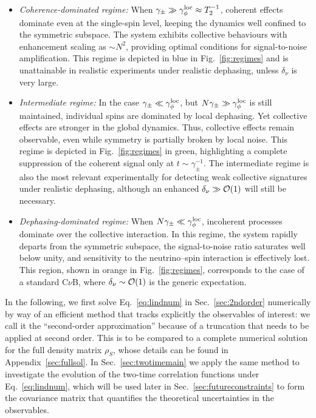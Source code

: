 \documentclass[aps,prd,10pt,twocolumn,superscriptaddress,floatfix,nofootinbib,amsmath,amssymb,altaffilletter,preprintnumbers]{revtex4-1}
\begin{document}
\begin{itemize}
    \item \emph{Coherence-dominated regime:} When $\gamma_{\pm} \gg \gamma^{\rm loc}_{\phi} \approx T_2^{-1}$, coherent effects dominate even at the single-spin level, keeping the dynamics well confined to the symmetric subspace. The system exhibits collective behaviours with enhancement scaling as $\sim N^2$, providing optimal conditions for signal-to-noise amplification. This regime is depicted in blue in Fig.~\ref{fig:regimes} and is unattainable in realistic experiments under realistic dephasing, unless $\delta_\nu$ is very large.

    \item \emph{Intermediate regime:} In the case $\gamma_{\pm} \ll \gamma^{\rm loc}_{\phi}$, but $N\gamma_{\pm} \gg \gamma^{\rm loc}_{\phi}$ is still maintained, individual spins are dominated by local dephasing. Yet collective effects are stronger in the global dynamics. Thus, collective effects remain observable, even while symmetry is partially broken by local noise.
    This regime is depicted in Fig.~\ref{fig:regimes} in green, highlighting a complete suppression of the coherent signal only at $t\sim\gamma^{-1}_{\pm}$.   The intermediate regime is also the most relevant experimentally for detecting weak collective signatures under realistic dephasing, although an enhanced $\delta_{\nu}\gg {\cal O}(1)$ will still be necessary. 
    
    \item \emph{Dephasing-dominated regime:} When $N\gamma_{\pm} \ll \gamma^{\rm loc}_{\phi}$, incoherent processes dominate over the collective interaction. In this regime, the system rapidly departs from the symmetric subspace, the signal-to-noise ratio saturates well below unity, and sensitivity to the neutrino–spin interaction is effectively lost. This region, shown in orange in Fig.~\ref{fig:regimes}, corresponds to the case of a standard C$\nu$B, where $\delta_\nu \sim {\cal O}(1)$ is the generic expectation. 
   
\end{itemize}




In the following, we first solve Eq.~\eqref{eq:lindnum} in Sec.~\ref{sec:2ndorder}
numerically by way of an efficient method that tracks explicitly the observables of interest: we call it the ``second-order approximation'' because of a truncation that needs to be applied at second order.  This is to be compared to a complete numerical solution for the full density matrix $\rho_S$, whose details can be found in Appendix~\ref{sec:fullsol}.  In Sec.~\ref{sec:twotimemain} we apply the same method to investigate the evolution of the two-time correlation functions under Eq.~\eqref{eq:lindnum}, which will be used later in Sec.~\ref{sec:futureconstraints} to form the covariance matrix that quantifies the theoretical uncertainties in the observables.
\end{document}
